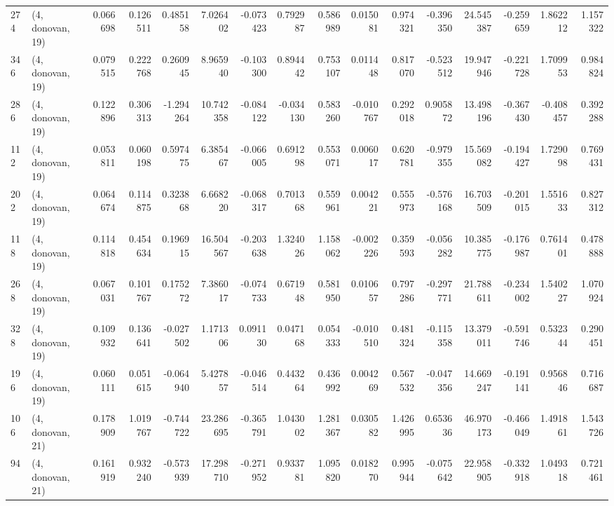 \begin{tabular}{llrrrrrrrrrrrrrr}
274 &  (4, donovan, 19) &   0.066698 &  0.126511 &  0.485158 &    7.026402 & -0.073423 &   0.792987 &  0.586989 &  0.015081 &  0.974321 & -0.396350 &    24.545387 & -0.259659 &  1.862212 &  1.157322 \\
346 &  (4, donovan, 19) &   0.079515 &  0.222768 &  0.260945 &    8.965940 & -0.103300 &   0.894442 &  0.753107 &  0.011448 &  0.817070 & -0.523512 &    19.947946 & -0.221728 &  1.709953 &  0.984824 \\
286 &  (4, donovan, 19) &   0.122896 &  0.306313 & -1.294264 &   10.742358 & -0.084122 &  -0.034130 &  0.583260 & -0.010767 &  0.292018 &  0.905872 &    13.498196 & -0.367430 & -0.408457 &  0.392288 \\
112 &  (4, donovan, 19) &   0.053811 &  0.060198 &  0.597475 &    6.385467 & -0.066005 &   0.691298 &  0.553071 &  0.006017 &  0.620781 & -0.979355 &    15.569082 & -0.194427 &  1.729098 &  0.769431 \\
202 &  (4, donovan, 19) &   0.064674 &  0.114875 &  0.323868 &    6.668220 & -0.068317 &   0.701368 &  0.559961 &  0.004221 &  0.555973 & -0.576168 &    16.703509 & -0.201015 &  1.551633 &  0.827312 \\
118 &  (4, donovan, 19) &   0.114818 &  0.454634 &  0.196915 &   16.504567 & -0.203638 &   1.324026 &  1.158062 & -0.002226 &  0.359593 & -0.056282 &    10.385775 & -0.176987 &  0.761401 &  0.478888 \\
268 &  (4, donovan, 19) &   0.067031 &  0.101767 &  0.175272 &    7.386017 & -0.074733 &   0.671948 &  0.581950 &  0.010657 &  0.797286 & -0.297771 &    21.788611 & -0.234002 &  1.540227 &  1.070924 \\
328 &  (4, donovan, 19) &   0.109932 &  0.136641 & -0.027502 &    1.171306 &  0.091130 &   0.047168 &  0.054333 & -0.010510 &  0.481324 & -0.115358 &    13.379011 & -0.591746 &  0.532344 &  0.290451 \\
196 &  (4, donovan, 19) &   0.060111 &  0.051615 & -0.064940 &    5.427857 & -0.046514 &   0.443264 &  0.436992 &  0.004269 &  0.567532 & -0.047356 &    14.669247 & -0.191141 &  0.956846 &  0.716687 \\
106 &  (4, donovan, 21) &   0.178909 &  1.019767 & -0.744722 &   23.286695 & -0.365791 &   1.043002 &  1.281367 &  0.030582 &  1.426995 &  0.653636 &    46.970173 & -0.466049 &  1.491861 &  1.543726 \\
94  &  (4, donovan, 21) &   0.161919 &  0.932240 & -0.573939 &   17.298710 & -0.271952 &   0.933781 &  1.095820 &  0.018270 &  0.995944 & -0.075642 &    22.958905 & -0.332918 &  1.049318 &  0.721461 \\

\end{tabular}
